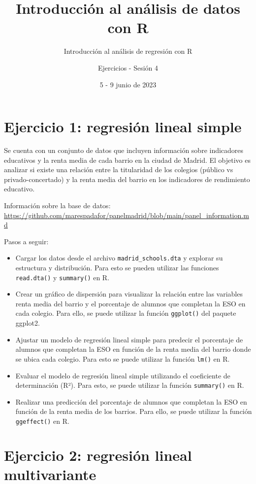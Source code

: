 \documentclass[
]{article}
\title{Introducción al análisis de datos con R}
\subtitle{Introducción al análisis de regresión con R}
\author{Ejercicios - Sesión 4}
\date{5 - 9 junio de 2023}
\begin{document}
\maketitle

\hypertarget{ejercicio-1-regresiuxf3n-lineal-simple}{%
\section{Ejercicio 1: regresión lineal
simple}\label{ejercicio-1-regresiuxf3n-lineal-simple}}

Se cuenta con un conjunto de datos que incluyen información sobre
indicadores educativos y la renta media de cada barrio en la ciudad de
Madrid. El objetivo es analizar si existe una relación entre la
titularidad de los colegios (público vs privado-concertado) y la renta
media del barrio en los indicadores de rendimiento educativo.

Información sobre la base de datos:
\url{https://github.com/marespadafor/panelmadrid/blob/main/panel_information.md}

Pasos a seguir:

\begin{itemize}
\item
  Cargar los datos desde el archivo \texttt{madrid\_schools.dta} y
  explorar su estructura y distribución. Para esto se pueden utilizar
  las funciones \texttt{read.dta()} y \texttt{summary()} en R.
\item
  Crear un gráfico de dispersión para visualizar la relación entre las
  variables renta media del barrio y el porcentaje de alumnos que
  completan la ESO en cada colegio. Para ello, se puede utilizar la
  función \texttt{ggplot()} del paquete ggplot2.
\item
  Ajustar un modelo de regresión lineal simple para predecir el
  porcentaje de alumnos que completan la ESO en función de la renta
  media del barrio donde se ubica cada colegio. Para esto se puede
  utilizar la función \texttt{lm()} en R.
\item
  Evaluar el modelo de regresión lineal simple utilizando el coeficiente
  de determinación (R²). Para esto, se puede utilizar la función
  \texttt{summary()} en R.
\item
  Realizar una predicción del porcentaje de alumnos que completan la ESO
  en función de la renta media de los barrios. Para ello, se puede
  utilizar la función \texttt{ggeffect()} en R.
\end{itemize}

\hypertarget{ejercicio-2-regresiuxf3n-lineal-multivariante}{%
\section{Ejercicio 2: regresión lineal
multivariante}\label{ejercicio-2-regresiuxf3n-lineal-multivariante}}
\end{document}
